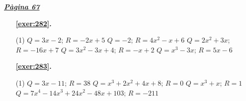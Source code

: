 
\hyperlink{page.67}{\textbf{\em Pàgina 67}}
\begin{enumerate}



 \item[\fontfamily{phv}\selectfont\color{blue}\textbf{\ref{exer:282}. }] \label{ans:282}
 \begin{tasks}[column-sep=1em, item-indent=1.3333em](1)
	 \task $Q=3x-2$; $R=-2x+5$
	 \task $Q=-2$; $R=4x^2-x+6$
	 \task $Q=2x^2+3x$; $R=-16x+7$
	 \task $Q=3x^2-3x+4$; $R=-x+2$
	 \task $Q=x^3-3x$; $R=5x-6$
\end{tasks}
 \end{enumerate}
\begin{enumerate}



 \item[\fontfamily{phv}\selectfont\color{blue}\textbf{\ref{exer:283}. }] \label{ans:283}
 \begin{tasks}[column-sep=1em, item-indent=1.3333em](1)
	 \task $Q=3x-11$; $R=38$
	 \task $Q=x^3+2x^2+4x+8$; $R=0$
	 \task $Q=x^3+x$; $R=1$
	 \task* $Q=7x^4-14x^3+24x^2-48x+103$; $R=-211$
\end{tasks}
 \end{enumerate}
\vspace{0.3cm}


